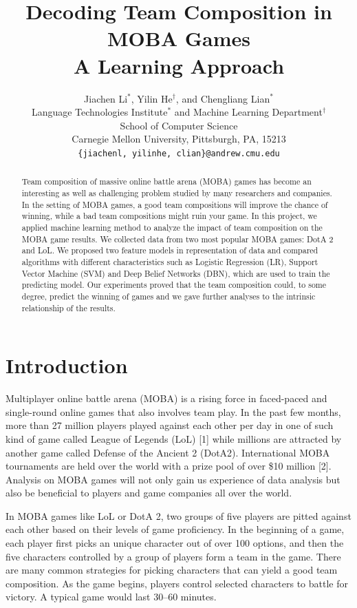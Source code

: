 \documentclass{article} %
\title{Decoding Team Composition in MOBA Games \\ A Learning Approach}
\author{
Jiachen Li$^*$, Yilin He$^\dag$, and Chengliang Lian$^*$\\
Language Technologies Institute$^*$ and Machine Learning Department$^\dag$ \\ School of Computer Science \\
Carnegie Mellon University, Pittsburgh, PA, 15213 \\
\texttt{\{jiachenl, yilinhe, clian\}@andrew.cmu.edu}
}
\begin{document}
\maketitle

\begin{abstract}
Team composition of massive online battle arena (MOBA) games has become an interesting as well as challenging problem studied by many researchers and companies. In the setting of MOBA games, a good team compositions will improve the chance of winning, while a bad team compositions might ruin your game.
In this project, we applied machine learning method to analyze the impact of team composition on the MOBA game results. We collected data from two most popular MOBA games: DotA 2 and LoL. We proposed two feature models in representation of data and compared algorithms with different characteristics such as Logistic Regression (LR), Support Vector Machine (SVM) and Deep Belief Networks (DBN), which are used to train the predicting model. Our experiments proved that the team composition could, to some degree, predict the winning of games and we gave further analyses to the intrinsic relationship of the results.
\end{abstract}

\section{Introduction}




Multiplayer online battle arena (MOBA) is a rising force in faced-paced and single-round online games that also involves team play. In the past few months, more than 27 million players played against each other per day in one of such kind of game called League of Legends (LoL) [1] while millions are attracted by another game called Defense of the Ancient 2 (DotA2). International MOBA tournaments are held over the world with a prize pool of over \$10 million [2].  Analysis on MOBA games will not only gain us experience of data analysis but also be beneficial to players and game companies all over the world.

In MOBA games like LoL or DotA 2, two groups of five players are pitted against each other based on their levels of game proficiency. In the beginning of a game, each player first picks an unique character out of over 100 options, and then the five characters controlled by a group of players form a team in the game. There are many common strategies for picking characters that can yield a good team composition. As the game begins, players control selected characters to battle for victory. A typical game would last 30--60 minutes.
\end{document}

